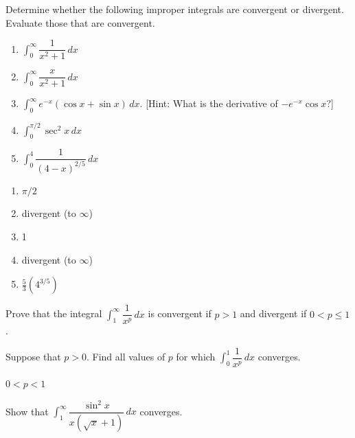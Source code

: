 \begin{enumialphparenastyle}
\begin{ex}
	Determine whether the following improper integrals are convergent or divergent. Evaluate those that are convergent.
	\begin{enumerate}
		\item	$\int_{0}^{\infty}\dfrac{1}{x^2+1}\,dx$
		\item	$\int_{0}^{\infty}\dfrac{x}{x^2+1}\,dx$
		\item	$\int_{0}^{\infty}e^{-x}(\cos x+\sin x)\,dx$. [Hint: What is the derivative of $-e^{-x}\cos x?$]
		\item	$\int_{0}^{\pi/2}\sec^{2}x\,dx$
		\item	$\int_{0}^{4}\dfrac{1}{(4-x)^{2/5}}\,dx$
	\end{enumerate}
	\begin{sol}
		\begin{enumerate}
			\item	$\pi/2$
			\item	divergent (to $\infty$)
			\item	1
			\item	divergent (to $\infty$)
			\item	$\frac{5}{3}(4^{3/5})$
		\end{enumerate}
	\end{sol}
\end{ex}

\begin{ex}
	Prove that the integral $\int_{1}^{\infty}\dfrac{1}{x^p}\,dx$ is convergent if $p>1$ and divergent if $0<p\leq 1$.
\end{ex}

\begin{ex}
	Suppose that $p>0$. Find all values of $p$ for which $\int_{0}^{1}\dfrac{1}{x^p}\,dx$ converges.
	\begin{sol}
		$0<p<1$
	\end{sol}
\end{ex}

\begin{ex}
	Show that $\int_{1}^{\infty}\dfrac{\sin^2 x}{x(\sqrt{x}+1)}\,dx$ converges.
\end{ex}

\end{enumialphparenastyle}